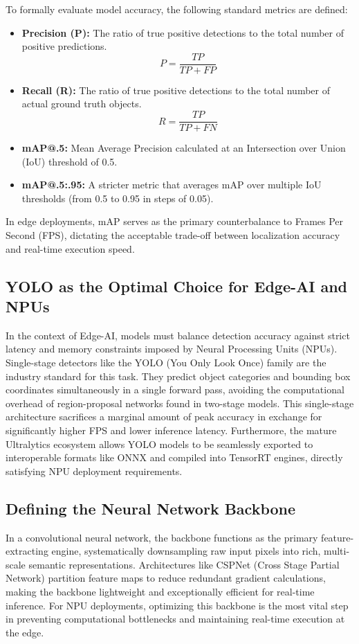 To formally evaluate model accuracy, the following standard metrics are defined:
\begin{itemize}
    \item \textbf{Precision (P):} The ratio of true positive detections to the total number of positive predictions.
    \begin{equation}
        P = \frac{TP}{TP + FP}
    \end{equation}
    \item \textbf{Recall (R):} The ratio of true positive detections to the total number of actual ground truth objects.
    \begin{equation}
        R = \frac{TP}{TP + FN}
    \end{equation}
    \item \textbf{mAP@.5:} Mean Average Precision calculated at an Intersection over Union (IoU) threshold of 0.5.
    \item \textbf{mAP@.5:.95:} A stricter metric that averages mAP over multiple IoU thresholds (from 0.5 to 0.95 in steps of 0.05).
\end{itemize}

In edge deployments, mAP serves as the primary counterbalance to Frames Per Second (FPS), dictating the acceptable trade-off between localization accuracy and real-time execution speed.

\subsection{YOLO as the Optimal Choice for Edge-AI and NPUs}
In the context of Edge-AI, models must balance detection accuracy against strict latency and memory constraints imposed by Neural Processing Units (NPUs). Single-stage detectors like the YOLO (You Only Look Once) family are the industry standard for this task. They predict object categories and bounding box coordinates simultaneously in a single forward pass, avoiding the computational overhead of region-proposal networks found in two-stage models. This single-stage architecture sacrifices a marginal amount of peak accuracy in exchange for significantly higher FPS and lower inference latency. Furthermore, the mature Ultralytics ecosystem allows YOLO models to be seamlessly exported to interoperable formats like ONNX and compiled into TensorRT engines, directly satisfying NPU deployment requirements.

\subsection{Defining the Neural Network Backbone}
In a convolutional neural network, the backbone functions as the primary feature-extracting engine, systematically downsampling raw input pixels into rich, multi-scale semantic representations. Architectures like CSPNet (Cross Stage Partial Network) \cite{ref:cspnet} partition feature maps to reduce redundant gradient calculations, making the backbone lightweight and exceptionally efficient for real-time inference. For NPU deployments, optimizing this backbone is the most vital step in preventing computational bottlenecks and maintaining real-time execution at the edge.

